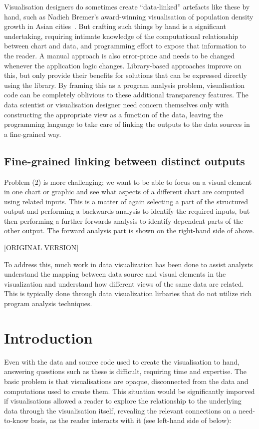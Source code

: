 Visualisation designers do sometimes create ``data-linked'' artefacts like these by hand, such as Nadieh Bremer's award-winning visualisation of population density growth in Asian cities~\cite{bremer15}. But crafting such things by hand is a significant undertaking, requiring intimate knowledge of the computational relationship between chart and data, and programming effort to expose that information to the reader. A manual approach is also error-prone and needs to be changed whenever the application logic changes. Library-based approaches improve on this, but only provide their benefits for solutions that can be expressed directly using the library. By framing this as a program analysis problem, visualisation code can be completely oblivious to these additional transparency features. The data scientist or visualisation designer need concern themselves only with constructing the appropriate view as a function of the data, leaving the programming language to take care of linking the outputs to the data sources in a fine-grained way.

\subsection{Fine-grained linking between distinct outputs}

Problem (2) is more challenging; we want to be able to focus on a visual element in one chart or graphic and see what aspects of a different chart are computed using related inputs. This is a matter of again selecting a part of the structured output and performing a backwards analysis to identify the required inputs, but then performing a further forwards analysis to identify dependent parts of the other output. The forward analysis part is shown on the right-hand side of  above.

[ORIGINAL VERSION]

To address this, much work in data visualization has been done to assist analysts understand the mapping between data source and visual elements in the visualization and understand how different views of the same data are related. This is typically done through data visualization lirbaries that do not utilize rich program analysis techniques.

\section{Introduction}

\noindent Even with the data and source code used to create the visualisation to hand, answering questions such as these is difficult, requiring time and expertise. The basic problem is that visualisations are opaque, disconnected from the data and computations used to create them. This situation would be significantly imporved if visualisations allowed a reader to explore the relationship to the underlying data through the visualisation itself, revealing the relevant connections on a need-to-know basis, as the reader interacts with it (see left-hand side of  below):

